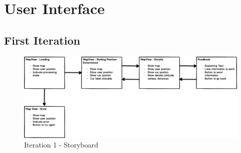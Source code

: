 \chapter{User Interface}
\label{appendix:userInterface}

\section{First Iteration}
\begin{figure}[H]
    \centering
    \includegraphics[width=\textwidth]{images/UI/Iteration1-Overview.png}
    \caption{Iteration 1 - Storyboard}
    \label{fig:i1story}
\end{figure}


